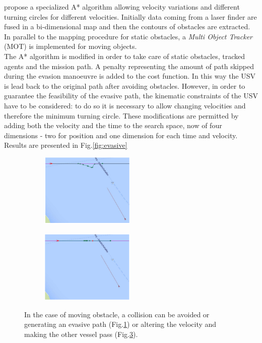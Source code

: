 \documentclass[12pt]{article}
\begin{document}
              \indent \textcite{Blaich2015} propose a specialized A* algorithm allowing velocity variations and different turning circles for different velocities. Initially data coming from a laser finder are fused in a bi-dimensional map and then the contours of obstacles are extracted.\\
              In parallel to the mapping procedure for static obstacles, a \textit{Multi Object Tracker} (MOT) is implemented for moving objects.\\
              The A* algorithm is modified in order to take care of static obstacles, tracked agents and the mission path. A penalty representing the amount of path skipped during the evasion manoeuvre is added to the cost function. In this way the USV is lead back to the original path after avoiding obstacles. However, in order to guarantee the feasibility of the evasive path, the kinematic constraints of the USV have to be considered: to do so it is necessary to allow changing velocities and therefore the minimum turning circle. These modifications are permitted by adding both the velocity and the time to the search space, now of four dimensions - two for position and one dimension for each time and velocity. Results are presented in Fig.\ref{fig:evasive}

              \begin{figure}
                    \centering

                    \begin{subfigure}[b]{.40\linewidth}
                    \includegraphics[width=\linewidth, height= 3.5cm]{./Images/Blaich/evasive1}
                    \caption{}\label{fig:evasive1}
                    \end{subfigure}
                    \begin{subfigure}[b]{.40\linewidth}
                    \includegraphics[width=\linewidth, height= 3.5cm]{./Images/Blaich/evasive2}
                    \caption{}\label{fig:evasive2}
                    \end{subfigure}
                    \caption{In the case of moving obstacle, a collision can be avoided or generating an evasive path (Fig.\ref{fig:evasive1}) or altering the velocity and making the other vessel pass (Fig.\ref{fig:evasive2}). }
              \end{figure}\label{fig:evasive}
\end{document}
